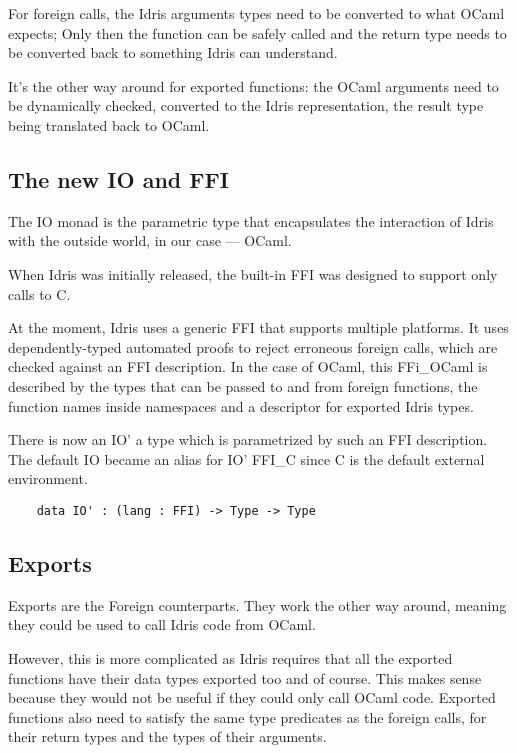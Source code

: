 For foreign calls, the Idris arguments types need to be converted
to what OCaml expects; Only then the function can be safely
called and the return type needs to be converted back to
something Idris can understand.

It's the other way around for exported functions: the OCaml
arguments need to be dynamically checked, converted to
the Idris representation, the result type being translated back
to OCaml.

\subsection{The new IO and FFI}
The IO monad is the parametric type that encapsulates the
interaction of Idris with the outside world, in our case --- OCaml.

When Idris was initially released, the built-in FFI was designed
to support only calls to C.

At the moment, Idris uses a generic
FFI that supports multiple platforms\citep{crosscompilers}.
It uses dependently-typed automated proofs to reject erroneous
foreign calls, which are checked against an FFI description.
In the case of OCaml, this FFi\_OCaml is described by the types that can be
passed to and from foreign functions, the function names inside namespaces
and a descriptor for exported Idris types.

There is now an IO' a type which is parametrized by such an FFI description.
The default IO became an alias for IO' FFI\_C since C is the default external
environment.

\begin{verbatim}
    data IO' : (lang : FFI) -> Type -> Type 
\end{verbatim}


\subsection{Exports}
Exports are the Foreign counterparts. They work the other way around,
meaning they could be used to call Idris code from OCaml.

However, this is more complicated as Idris requires that all the exported
functions have their data types exported too and of course.
This makes sense because they would not be useful if they could only call
OCaml code.
Exported functions also need to satisfy the same type predicates as the
foreign calls, for their return types and the types of their arguments.

